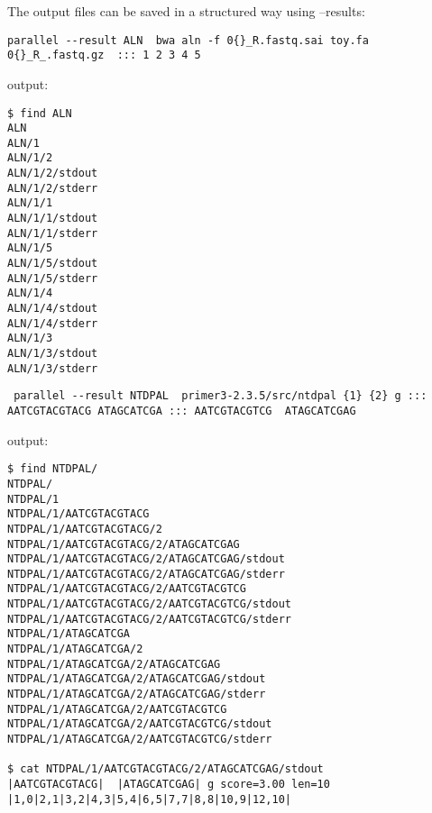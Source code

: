 \documentclass{article}
\begin{document}
The output files can be saved in a structured way using --results:
\begin{lstlisting}
parallel --result ALN  bwa aln -f 0{}_R.fastq.sai toy.fa 0{}_R_.fastq.gz  ::: 1 2 3 4 5
\end{lstlisting}
output:
\begin{lstlisting}
$ find ALN
ALN
ALN/1
ALN/1/2
ALN/1/2/stdout
ALN/1/2/stderr
ALN/1/1
ALN/1/1/stdout
ALN/1/1/stderr
ALN/1/5
ALN/1/5/stdout
ALN/1/5/stderr
ALN/1/4
ALN/1/4/stdout
ALN/1/4/stderr
ALN/1/3
ALN/1/3/stdout
ALN/1/3/stderr
\end{lstlisting}

\begin{lstlisting}
 parallel --result NTDPAL  primer3-2.3.5/src/ntdpal {1} {2} g ::: AATCGTACGTACG ATAGCATCGA ::: AATCGTACGTCG  ATAGCATCGAG
\end{lstlisting}
output:
\begin{lstlisting}
$ find NTDPAL/
NTDPAL/
NTDPAL/1
NTDPAL/1/AATCGTACGTACG
NTDPAL/1/AATCGTACGTACG/2
NTDPAL/1/AATCGTACGTACG/2/ATAGCATCGAG
NTDPAL/1/AATCGTACGTACG/2/ATAGCATCGAG/stdout
NTDPAL/1/AATCGTACGTACG/2/ATAGCATCGAG/stderr
NTDPAL/1/AATCGTACGTACG/2/AATCGTACGTCG
NTDPAL/1/AATCGTACGTACG/2/AATCGTACGTCG/stdout
NTDPAL/1/AATCGTACGTACG/2/AATCGTACGTCG/stderr
NTDPAL/1/ATAGCATCGA
NTDPAL/1/ATAGCATCGA/2
NTDPAL/1/ATAGCATCGA/2/ATAGCATCGAG
NTDPAL/1/ATAGCATCGA/2/ATAGCATCGAG/stdout
NTDPAL/1/ATAGCATCGA/2/ATAGCATCGAG/stderr
NTDPAL/1/ATAGCATCGA/2/AATCGTACGTCG
NTDPAL/1/ATAGCATCGA/2/AATCGTACGTCG/stdout
NTDPAL/1/ATAGCATCGA/2/AATCGTACGTCG/stderr

$ cat NTDPAL/1/AATCGTACGTACG/2/ATAGCATCGAG/stdout
|AATCGTACGTACG|  |ATAGCATCGAG| g score=3.00 len=10 |1,0|2,1|3,2|4,3|5,4|6,5|7,7|8,8|10,9|12,10|
\end{lstlisting}
\end{document}
